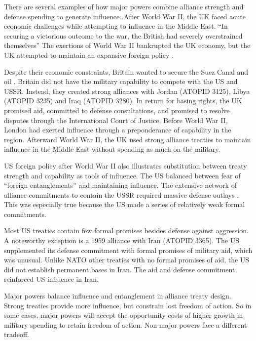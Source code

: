 \documentclass[12pt]{article}
\begin{document}
There are several examples of how major powers combine alliance strength and defense spending to generate influence.
After World War II, the UK faced acute economic challenges while attempting to influence in the Middle East. 
``In securing a victorious outcome to the war, the British had severely overstrained themselves'' \citep[pg. 367]{Kennedy1987}
The exertions of World War II bankrupted the UK economy, but the UK attempted to maintain an expansive foreign policy \citep{Mayhew1950}. 
  

Despite their economic constraints, Britain wanted to secure the Suez Canal and oil \citep{Rahman1982}. 
Britain did not have the military capability to compete with the US and USSR. 
Instead, they created strong alliances with Jordan (ATOPID 3125), Libya (ATOPID 3235) and Iraq (ATOPID 3280). 
In return for basing rights, the UK promised aid, committed to defense consultations, and promised to resolve disputes through the International Court of Justice. 
Before World War II, London had exerted influence through a preponderance of capability in the region.
Afterward World War II, the UK used strong alliance treaties to maintain influence in the Middle East without spending as much on the military. 


US foreign policy after World War II also illustrates substitution between treaty strength and capability as tools of influence. 
The US balanced between fear of ``foreign entanglements'' and maintaining influence. 
The extensive network of alliance commitments to contain the USSR required massive defense outlays \citep{Fordham1998}. 
This was especially true because the US made a series of relatively weak formal commitments. 


Most US treaties contain few formal promises besides defense against aggression. 
A noteworthy exception is a 1959 alliance with Iran (ATOPID 3365). 
The US supplemented its defense commitment with formal promises of military aid, which was unusual. 
Unlike NATO other treaties with no formal promises of aid, the US did not establish permanent bases in Iran. 
The aid and defense commitment reinforced US influence in Iran. 


Major powers balance influence and entanglement in alliance treaty design. 
Strong treaties provide more influence, but constrain lost freedom of action. 
So in some cases, major powers will accept the opportunity costs of higher growth in military spending to retain freedom of action. 
Non-major powers face a different tradeoff. 
\end{document}
